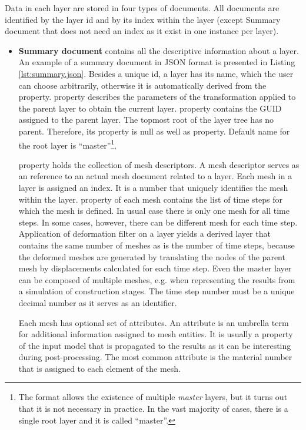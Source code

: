 
Data in each layer are stored in four types of documents. All documents are identified by the layer id and by its index within the layer (except Summary document that does not need an index as it exist in one instance per layer).
\begin{itemize}

    \item \textbf{Summary document} contains all the descriptive information about a layer. An example of a summary document in JSON format is presented in Listing \ref{lst:summary.json}. Besides a unique id, a layer has its name, which the user can choose arbitrarily, otherwise it is automatically derived from the  property.  property describes the parameters of the transformation applied to the parent layer to obtain the current layer.  property contains the GUID assigned to the parent layer. The topmost root of the layer tree has no parent. Therefore, its  property is null as well as  property. Default name for the root layer is ``master''\footnote{The format allows the existence of multiple \textit{master} layers, but it turns out that it is not necessary in practice. In the vast majority of cases, there is a single root layer and it is called ``master''.}.

     property holds the collection of mesh descriptors. A mesh descriptor serves as an reference to an actual mesh document related to a layer. Each mesh in a layer is assigned an index. It is a number that uniquely identifies the mesh within the layer.  property of each mesh contains the list of time steps for which the mesh is defined. In usual case there is only one mesh for all time steps. In some cases, however, there can be different mesh for each time step. Application of deformation filter on a layer yields a derived layer that contains the same number of meshes as is the number of time steps, because the deformed meshes are generated by translating the nodes of the parent mesh by displacements calculated for each time step. Even the master layer can be composed of multiple meshes, e.g. when representing the results from a simulation of construction stages. The time step number must be a unique decimal number as it serves as an identifier.
    
    Each mesh has optional set of attributes. An attribute is an umbrella term for additional information assigned to mesh entities. It is usually a property of the input model that is propagated to the results as it can be interesting during post-processing. The most common attribute is the material number that is assigned to each element of the mesh.


\end{itemize}
